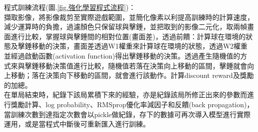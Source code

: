 \documentclass[14pt,a4paper]{report}  %
\begin{document}
程式訓練流程(圖.\ref{fig.強化學習程式流程})：\\
 擷取影像，將影像裁剪至實際遊戲範圍，並簡化像素以利提高訓練時的計算速度，減少運算時的負擔，過濾顏色只保留球與擊錘，並把取到的影像二元化，取兩幀畫面進行比較，掌握球與擊錘間的相對位置(畫面差)，透過前饋：計算球在環境的狀態及擊錘移動的決策，畫面差透過W1權重來計算球在環境的狀態，透過W2權重並經過啟動函數(activation function)得出擊錘移動的決策。透過產生隨機值的方式來與擊錘移動決策值進行比較，隨機值若落在決策向上移動的區間，擊錘就會向上移動；落在決策向下移動的區間，就會進行該動作。計算discount reward及獎勵的加總。\\

 在單局結束時，紀錄下該局累積下來的經驗，亦是紀錄該局所修正出來的參數而進行獎勵計算、log probability、RMSprop優化率減因子和反饋(back propagation)，當訓練次數到達指定次數會以pickle做紀錄，存下的數據可再次導入模型進行實際運用，或是當程式中斷後可重新匯入進行訓練。\\

\newpage
\end{document}
